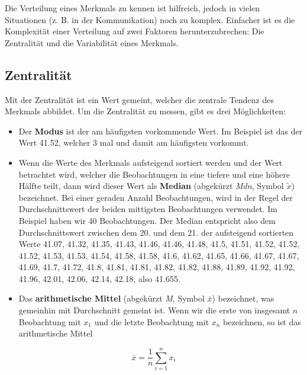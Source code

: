 \documentclass[
]{book}
\providecommand{\tightlist}{%
  \setlength{\itemsep}{0pt}\setlength{\parskip}{0pt}}
\theoremstyle{definition}
\theoremstyle{definition}
\theoremstyle{definition}
\theoremstyle{definition}
\theoremstyle{remark}
\begin{document}
Die Verteilung eines Merkmals zu kennen ist hilfreich, jedoch in vielen Situationen (z. B. in der Kommunikation) noch zu komplex. Einfacher ist es die Komplexität einer Verteilung auf zwei Faktoren herunterzubrechen: Die Zentralität und die Variabilität eines Merkmals.

\subsection{Zentralität}\label{zentralitaet}

Mit der Zentralität ist ein Wert gemeint, welcher die zentrale Tendenz des Merkmals abbildet. Um die Zentralität zu messen, gibt es drei Möglichkeiten:

\begin{itemize}
\tightlist
\item
  \label{customdef-modus}{Der \textbf{Modus} ist der am häufigsten vorkommende Wert.} Im Beispiel ist das der Wert 41.52, welcher 3 mal und damit am häufigsten vorkommt.
\item
  \label{customdef-median}{Wenn die Werte des Merkmals aufsteigend sortiert werden und der Wert betrachtet wird, welcher die Beobachtungen in eine tiefere und eine höhere Hälfte teilt, dann wird dieser Wert als \textbf{Median} (abgekürzt \emph{Mdn}, Symbol \(\tilde{x}\)) bezeichnet.} Bei einer geraden Anzahl Beobachtungen, wird in der Regel der Durchschnittswert der beiden mittigsten Beobachtungen verwendet. Im Beispiel haben wir 40 Beobachtungen. Der Median entspricht also dem Durchschnittswert zwischen dem 20. und dem 21. der aufsteigend sortierten Werte 41.07, 41.32, 41.35, 41.43, 41.46, 41.46, 41.48, 41.5, 41.51, 41.52, 41.52, 41.52, 41.53, 41.53, 41.54, 41.58, 41.58, 41.6, 41.62, 41.65, 41.66, 41.67, 41.67, 41.69, 41.7, 41.72, 41.8, 41.81, 41.81, 41.82, 41.82, 41.88, 41.89, 41.92, 41.92, 41.96, 42.01, 42.06, 42.14, 42.18, also 41.655.
\item
  \label{customdef-arithmetisches-mittel}{Das \textbf{arithmetische Mittel} (abgekürzt \emph{M}, Symbol \(\bar{x}\)) bezeichnet, was gemeinhin mit Durchschnitt gemeint ist.} Wenn wir die erste von insgesamt \(n\) Beobachtung mit \(x_1\) und die letzte Beobachtung mit \(x_n\) bezeichnen, so ist das arithmetische Mittel
\end{itemize}

\begin{equation}
\bar{x} = \frac{1}{n}\sum^n_{i=1} x_i
\label{eq:mean}
\end{equation}
\end{document}
